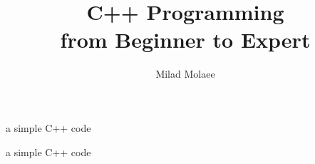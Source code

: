 \documentclass[11pt]{beamer}
\author[miladmolaee@hotmail.com]{Milad Molaee}
\title[C++ Programming]{C++ Programming\\\vspace{10pt}from Beginner to Expert\\\vspace{20pt}{\color{darkblue}\large Chapter 1 : Introduction to Computers and Programming}}
\begin{document}
 
%
\frame{\titlepage}

%

\begin{frame}{a simple C++ code}

\end{frame}

\begin{frame}{a simple C++ code}
	
\end{frame}
%
\end{document}
